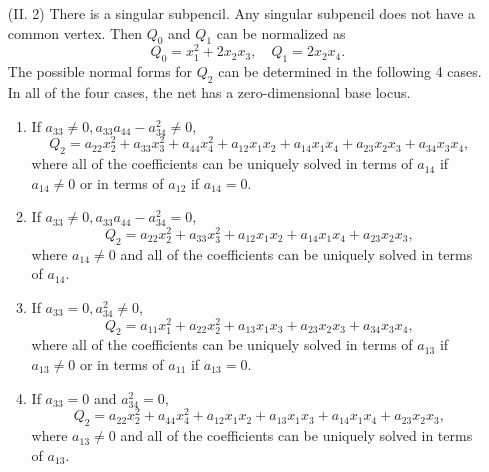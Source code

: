 \documentclass{amsart}[12pt]
\theoremstyle{definition}
\theoremstyle{remark}
\numberwithin{equation}{section}
\begin{document}
\begin{itemize}
\item[(II. 2)] There is a singular subpencil. Any singular subpencil does not have a common vertex. Then $Q_0$ and $Q_1$ can be normalized as
\[
Q_0 = x_1^2 + 2x_2x_3, \quad Q_1 = 2x_2x_4.
\]
The possible normal forms for $Q_2$ can be determined in the following 4 cases. In all of the four cases, the net has a zero-dimensional base locus.
\begin{enumerate}
\item If $a_{33} \neq 0, a_{33}a_{44} - a_{34}^2 \neq 0$,
\[
Q_2 = a_{22}x_2^2 + a_{33}x_3^2 + a_{44}x_4^2 + a_{12}x_1x_2 + a_{14}x_1x_4 + a_{23}x_2x_3 + a_{34}x_3x_4,
\]
where all of the coefficients can be uniquely solved in terms of $a_{14}$ if $a_{14} \neq 0$ or in terms of $a_{12}$ if $a_{14} = 0$.
\item If $a_{33} \neq 0, a_{33}a_{44} - a_{34}^2 = 0$,
\[
Q_2 = a_{22}x_2^2 + a_{33}x_3^2  + a_{12}x_1x_2 + a_{14}x_1x_4 + a_{23}x_2x_3,
\]
where $a_{14} \neq 0$ and all of the coefficients can be uniquely solved in terms of $a_{14}$.
\item If $a_{33} = 0, a_{34}^2 \neq 0$,
\[
Q_2 = a_{11}x_1^2 + a_{22}x_2^2 + a_{13}x_1x_3 + a_{23}x_2x_3 + a_{34}x_3x_4,
\]
where all of the coefficients can be uniquely solved in terms of $a_{13}$ if $a_{13} \neq 0$ or in terms of $a_{11}$ if $a_{13} = 0$.
\item If $a_{33} = 0$ and $a_{34}^2 = 0$,
\[
Q_2 = a_{22}x_2^2 + a_{44}x_4^2 + a_{12}x_1x_2 + a_{13}x_1x_3 + a_{14}x_1x_4 + a_{23}x_2x_3,
\]
where $a_{13} \neq 0$ and all of the coefficients can be uniquely solved in terms of $a_{13}$.
\end{enumerate}
\end{itemize}
\end{document}
